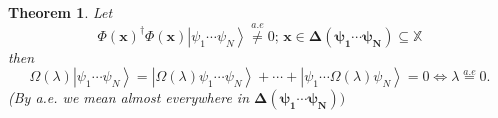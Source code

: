 \documentclass[aps,preprint]{revtex4}%
\newtheorem{theorem}{Theorem}
\begin{document}
\begin{theorem}
Let
\begin{equation}
\Phi\left(  \mathbf{x}\right)  ^{\dagger}\Phi\left(  \mathbf{x}\right)
\left\vert \psi_{1}\cdots\psi_{N}\right\rangle \overset{a.e}{\neq
}0;\,\mathbf{x\in\mathbf{\Delta}\left(  \psi_{1}\cdots\psi_{N}\right)
\subseteq}\mathbb{X}%
\end{equation}
then
\begin{equation}
\Omega\left(  \lambda\right)  \left\vert \psi_{1}\cdots\psi_{N}\right\rangle
=\left\vert \Omega\left(  \lambda\right)  \psi_{1}\cdots\psi_{N}\right\rangle
+\cdots+\left\vert \psi_{1}\cdots\Omega\left(  \lambda\right)  \psi
_{N}\right\rangle =0\Leftrightarrow\lambda\overset{a.e}{=}0.
\end{equation}
(By a.e. we mean almost everywhere in $\mathbf{\mathbf{\Delta}\left(  \psi
_{1}\cdots\psi_{N}\right)  )}$
\end{theorem}
\end{document}
